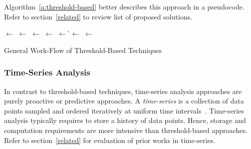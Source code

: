 Algorithm~\ref{a:threshold-based} better describes this approach in a pseudocode. Refer to section~\ref{related} to review list of proposed solutions.
\begin{algorithm}[h]
    \DontPrintSemicolon
    
    
    
    \ut $\gets$ \LFC{}\;
    \up $\gets$ \LFC{}\;
    \lt $\gets$ \LFC{}\;
    \lp $\gets$ \LFC{}\;
    \a $\gets$ \LFC{}\;
    \r $\gets$ \LFC{}\;
    \BlankLine
     {
        \x $\gets$ \GCMV{}\;
        \BlankLine
        \BlankLine
    }
    \caption{General Work-Flow of Threshold-Based Techniques}
    \label{a:threshold-based}
\end{algorithm}

\subsubsection{Time-Series Analysis}

In contrast to threshold-based techniques, time-series analysis approaches are purely proactive or predictive approaches. A \emph{time-series} is a collection of data points sampled and ordered iteratively at uniform time  intervals~\cite{Lorido-Botran2014}. Time-series analysis typically requires to store a history of data points. Hence, storage and computation requirements are more intensive than threshold-based approaches. Refer to section~\ref{related} for evaluation of prior works in time-series.


